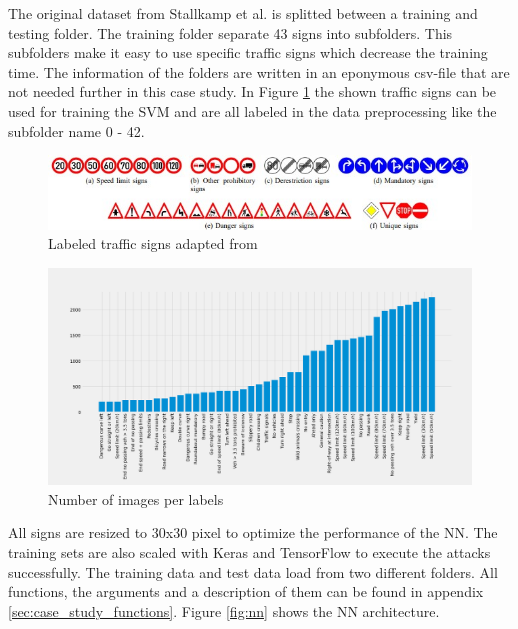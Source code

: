 The original dataset from Stallkamp et al. \cite{DBLP:conf/ijcnn/StallkampSSI11} is splitted between a training and testing folder. The training folder separate 43 signs into subfolders. This subfolders make it easy to use specific traffic signs which decrease the training time. The information of the folders are written in an eponymous csv-file that are not needed further in this case study. In Figure \ref{fig:traffic_signs} the shown traffic signs can be used for training the SVM and are all labeled in the data preprocessing like the subfolder name 0 - 42.

\begin{figure}[h!]
  \centering
  \includegraphics[width=12cm]{pictures/traffic_signs.jpg}
  \caption{Labeled traffic signs adapted from \cite{DBLP:conf/ijcnn/StallkampSSI11}}
  \label{fig:traffic_signs}
\end{figure}

\begin{figure}[h!]
  \centering
  \includegraphics[width=15cm]{pictures/num_of_images.png}
  \caption{Number of images per labels}
  \label{fig:num_of_images}
\end{figure}

All signs are resized to 30x30 pixel to optimize the performance of the NN. The training sets are also scaled with Keras and TensorFlow to execute the attacks successfully. The training data and test data load from two different folders. All functions, the arguments and a description of them can be found in appendix \ref{sec:case_study_functions}. Figure \ref{fig:nn} shows the NN architecture.

